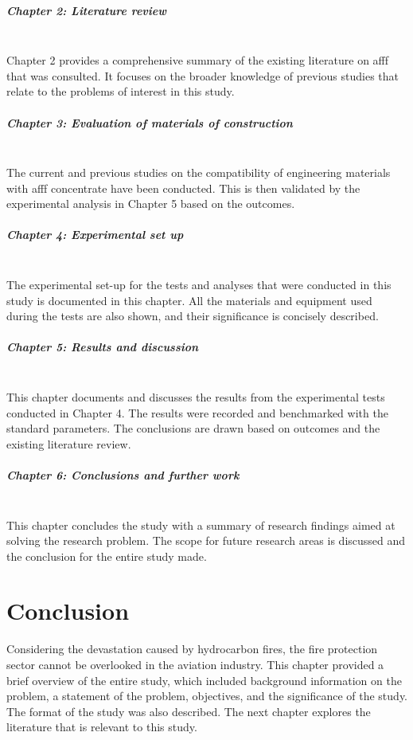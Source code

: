 \subparagraph*{Chapter 2: Literature review}\hfill\\
Chapter 2 provides a comprehensive summary of the existing literature on \acrshort{afff} that was consulted. It focuses on the broader knowledge of previous studies that relate to the problems of interest in this study.

\subparagraph*{Chapter 3: Evaluation of materials of construction}\hfill\\
The current and previous studies on the compatibility of engineering materials with \acrshort{afff} concentrate have been conducted. This is then validated by the experimental analysis in Chapter 5 based on the outcomes.

\subparagraph*{Chapter 4: Experimental set up}\hfill\\
The experimental set-up for the tests and analyses that were conducted in this study is documented in this chapter. All the materials and equipment used during the tests are also shown, and their significance is concisely described.

\subparagraph*{Chapter 5: Results and discussion}\hfill\\
This chapter documents and discusses the results from the experimental tests conducted in Chapter 4. The results were recorded and benchmarked with the standard parameters. The conclusions are drawn based on outcomes and the existing literature review. 

\subparagraph*{Chapter 6: Conclusions and further work}\hfill\\
This chapter concludes the study with a summary of research findings aimed at solving the research problem. The scope for future research areas is discussed and the conclusion for the entire study made.

\section{Conclusion}
Considering the devastation caused by hydrocarbon fires, the fire protection sector cannot be overlooked in the aviation industry. This chapter provided a brief overview of the entire study, which included background information on the problem, a statement of the problem, objectives, and the significance of the study. The format of the study was also described. The next chapter explores the literature that is relevant to this study.